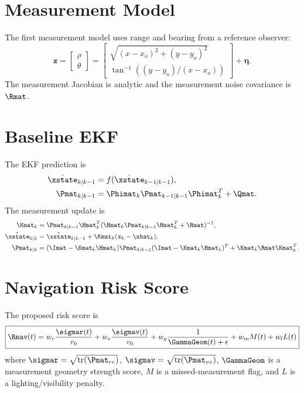\documentclass[11pt]{article}
\begin{document}
\section{Measurement Model}

The first measurement model uses range and bearing from a reference observer:
\begin{equation}
  \bm{z} =
  \begin{bmatrix}
  \rho\\
  \theta
  \end{bmatrix}
  =
  \begin{bmatrix}
  \sqrt{(x-x_o)^2+(y-y_o)^2}\\
  \tan^{-1}\left((y-y_o)/(x-x_o)\right)
  \end{bmatrix}
  + \bm{\eta}.
\end{equation}
The measurement Jacobian is analytic and the measurement noise covariance is
$\Rmat$.

\section{Baseline EKF}

The EKF prediction is
\begin{align}
  \hat{\xstate}_{k|k-1} &= f(\hat{\xstate}_{k-1|k-1}),\\
  \Pmat_{k|k-1} &= \Phimat_k \Pmat_{k-1|k-1}\Phimat_k^T + \Qmat.
\end{align}
The measurement update is
\begin{align}
  \Kmat_k &= \Pmat_{k|k-1}\Hmat_k^T
  (\Hmat_k\Pmat_{k|k-1}\Hmat_k^T+\Rmat)^{-1},\\
  \hat{\xstate}_{k|k} &= \hat{\xstate}_{k|k-1}
  + \Kmat_k(\bm{z}_k-\zhat_k),\\
  \Pmat_{k|k} &= (\Imat-\Kmat_k\Hmat_k)\Pmat_{k|k-1}
  (\Imat-\Kmat_k\Hmat_k)^T + \Kmat_k\Rmat\Kmat_k^T.
\end{align}

\section{Navigation Risk Score}

The proposed risk score is
\begin{equation}
\boxed{
\Rnav(t)
=
w_r \frac{\sigmar(t)}{r_0}
+
w_v \frac{\sigmav(t)}{v_0}
+
w_g \frac{1}{\GammaGeom(t)+\epsilon}
+
w_m M(t)
+
w_l L(t)
}
\end{equation}
where $\sigmar=\sqrt{\mathrm{tr}(\Pmat_{rr})}$,
$\sigmav=\sqrt{\mathrm{tr}(\Pmat_{vv})}$, $\GammaGeom$ is a measurement
geometry strength score, $M$ is a missed-measurement flag, and $L$ is a
lighting/visibility penalty.
\end{document}
